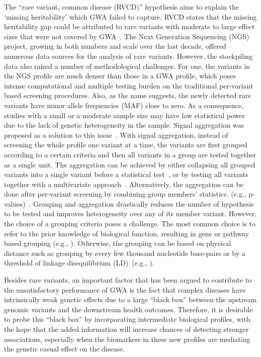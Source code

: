 \documentclass[11pt]{article}
\begin{document}
The ``rare variant, common disease (RVCD)'' hypothesis aims to explain the `missing heritability' which GWA failed to capture. RVCD states that the missing heritability gap could be attributed to rare variants with moderate to large effect sizes that were not covered by GWA~\citep{RVCD1}. The Next Generation Sequencing (NGS) project, growing in both numbers and scale over the last decade, offered numerous data sources for the analysis of rare variants. However, the stockpiling data also raised a number of methodological challenges. For one, the variants in the NGS profile are much denser than those in a GWA profile, which poses intense computational and multiple testing burden on the traditional per-variant based screening procedures. Also, as the name suggests, the newly detected rare variants have minor allele frequencies (MAF) close to zero. As a consequence, studies with a small or a moderate sample size may have low statistical power due to the lack of genetic heterogeneity in the sample. Signal aggregation was proposed as a solution to this issue~\citep{Burden1, UST1, UST2, SKAT, GCTA, Dai:2015, plink1}. With signal aggregation, instead of screening the whole profile one variant at a time, the variants are first grouped according to a certain criteria and then all variants in a group are tested together as a single unit. The aggregation can be achieved by either collapsing all grouped variants into a single variant before a statistical test~\citep{Burden1}, or by testing all variants together with a multivariate approach~\citep{UST1, UST2, SKAT, GCTA}. Alternatively, the aggregation can be done after per-variant screening by combining group members' statistics. (e.g., p-values)~\citep{Dai:2015, plink1, zaykin2002truncated}. Grouping and aggregation drastically reduces the number of hypothesis to be tested and improves heterogeneity over any of its member variant. However, the choice of a grouping criteria poses a challenge. The most common choice is to refer to the prior knowledge of biological function, resulting in gene or pathway based grouping (e.g., \citep{vsevolozhskaya2016uncovering}). Otherwise, the grouping can be based on physical distance such as grouping by every few thousand nucleotide base-pairs or by a threshold of linkage disequilibrium (LD)~(e.g., \citep{plink1}).

Besides rare variants, an important factor that has been argued to contribute to the unsatisfactory performance of GWA is the fact that complex diseases have intrinsically weak genetic effects due to a large ``black box'' between the upstream genomic variants and the downstream health outcomes. Therefore, it is desirable to probe this ``black box'' by incorporating intermediate biological profiles, with the hope that the added information will increase chances of detecting stronger associations, especially when the biomarkers in these new profiles are mediating the genetic casual effect on the disease. 
\end{document}
